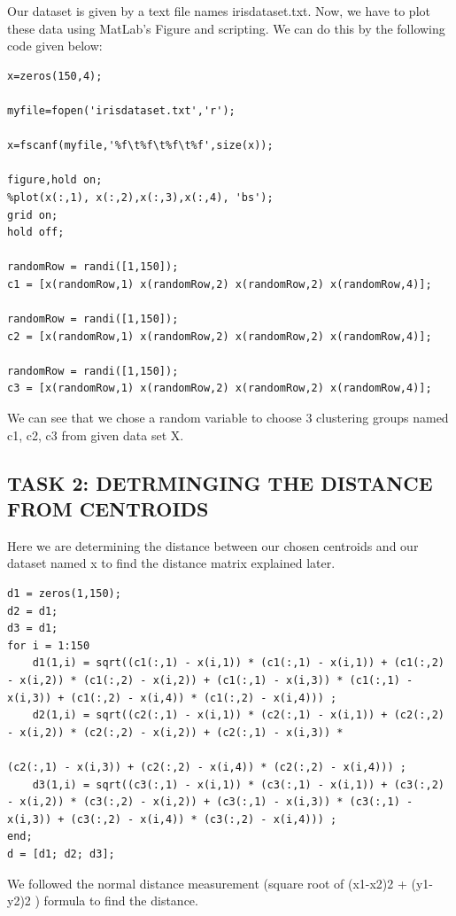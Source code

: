 \documentclass[conference]{IEEEtran}
\begin{document}
Our dataset is given by a text file names irisdataset.txt. Now, we have to plot these data using MatLab’s Figure and scripting. We can do this by the following code given below:\\
\begin{lstlisting}
x=zeros(150,4);

myfile=fopen('irisdataset.txt','r');

x=fscanf(myfile,'%f\t%f\t%f\t%f',size(x));

figure,hold on;
%plot(x(:,1), x(:,2),x(:,3),x(:,4), 'bs');
grid on;
hold off;
 
randomRow = randi([1,150]);
c1 = [x(randomRow,1) x(randomRow,2) x(randomRow,2) x(randomRow,4)];
 
randomRow = randi([1,150]);
c2 = [x(randomRow,1) x(randomRow,2) x(randomRow,2) x(randomRow,4)];
 
randomRow = randi([1,150]);
c3 = [x(randomRow,1) x(randomRow,2) x(randomRow,2) x(randomRow,4)];
\end{lstlisting}
We can see that we chose a random variable to choose 3 clustering groups named c1, c2, c3 from given data set X.\\

\subsection{TASK 2: DETRMINGING THE DISTANCE FROM CENTROIDS}

Here we are determining the distance between our chosen centroids and our dataset named x to find the distance matrix explained later.\\
\begin{lstlisting}
d1 = zeros(1,150);
d2 = d1;
d3 = d1;
for i = 1:150
    d1(1,i) = sqrt((c1(:,1) - x(i,1)) * (c1(:,1) - x(i,1)) + (c1(:,2) - x(i,2)) * (c1(:,2) - x(i,2)) + (c1(:,1) - x(i,3)) * (c1(:,1) - x(i,3)) + (c1(:,2) - x(i,4)) * (c1(:,2) - x(i,4))) ;
    d2(1,i) = sqrt((c2(:,1) - x(i,1)) * (c2(:,1) - x(i,1)) + (c2(:,2) - x(i,2)) * (c2(:,2) - x(i,2)) + (c2(:,1) - x(i,3)) * 

(c2(:,1) - x(i,3)) + (c2(:,2) - x(i,4)) * (c2(:,2) - x(i,4))) ;
    d3(1,i) = sqrt((c3(:,1) - x(i,1)) * (c3(:,1) - x(i,1)) + (c3(:,2) - x(i,2)) * (c3(:,2) - x(i,2)) + (c3(:,1) - x(i,3)) * (c3(:,1) - x(i,3)) + (c3(:,2) - x(i,4)) * (c3(:,2) - x(i,4))) ;
end;
d = [d1; d2; d3];
\end{lstlisting}

We followed the normal distance measurement (square root of (x1-x2)2  +  (y1-y2)2 ) formula to find the distance.\\
\end{document}
